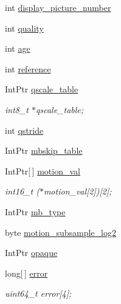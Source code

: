 \begin{DoxyCompactItemize}
\item 
int \hyperlink{struct_tao_1_1_f_fmpeg_1_1_f_fmpeg_1_1_a_v_frame_a6a74cbe724a8d8e713758e43b1b9d74c}{display\_\-picture\_\-number}
\item 
int \hyperlink{struct_tao_1_1_f_fmpeg_1_1_f_fmpeg_1_1_a_v_frame_adcb379855ce61aaa4e9628536374a1ee}{quality}
\item 
int \hyperlink{struct_tao_1_1_f_fmpeg_1_1_f_fmpeg_1_1_a_v_frame_ad5f4419aa6730caf1ee4ec80164c8874}{age}
\item 
int \hyperlink{struct_tao_1_1_f_fmpeg_1_1_f_fmpeg_1_1_a_v_frame_a1860efaee2f1c6f5efab3135d82668ab}{reference}
\item 
IntPtr \hyperlink{struct_tao_1_1_f_fmpeg_1_1_f_fmpeg_1_1_a_v_frame_ac23d7bd4f3cca8bbca90a40e8a5d7761}{qscale\_\-table}
\begin{DoxyCompactList}\small\item\em int8\_\-t $\ast$qscale\_\-table; \item\end{DoxyCompactList}\item 
int \hyperlink{struct_tao_1_1_f_fmpeg_1_1_f_fmpeg_1_1_a_v_frame_aead6278a888fe7a9237e6b61e3770ba8}{qstride}
\item 
IntPtr \hyperlink{struct_tao_1_1_f_fmpeg_1_1_f_fmpeg_1_1_a_v_frame_acff72d0cc65f263a4840f51cf28e6499}{mbskip\_\-table}
\item 
IntPtr\mbox{[}$\,$\mbox{]} \hyperlink{struct_tao_1_1_f_fmpeg_1_1_f_fmpeg_1_1_a_v_frame_a3030302698ee47779adfa2114fcb952c}{motion\_\-val}
\begin{DoxyCompactList}\small\item\em int16\_\-t ($\ast$motion\_\-val\mbox{[}2\mbox{]})\mbox{[}2\mbox{]}; \item\end{DoxyCompactList}\item 
IntPtr \hyperlink{struct_tao_1_1_f_fmpeg_1_1_f_fmpeg_1_1_a_v_frame_a3cbf839d220e4c2fbdbe0400ad34c182}{mb\_\-type}
\item 
byte \hyperlink{struct_tao_1_1_f_fmpeg_1_1_f_fmpeg_1_1_a_v_frame_aff7134ee6d609c50165689bf45834619}{motion\_\-subsample\_\-log2}
\item 
IntPtr \hyperlink{struct_tao_1_1_f_fmpeg_1_1_f_fmpeg_1_1_a_v_frame_afe3e6a5b5f9752bbd7000b705985f76d}{opaque}
\item 
long\mbox{[}$\,$\mbox{]} \hyperlink{struct_tao_1_1_f_fmpeg_1_1_f_fmpeg_1_1_a_v_frame_af9a97623ff7e2446c8cc815c61a27fa1}{error}
\begin{DoxyCompactList}\small\item\em uint64\_\-t error\mbox{[}4\mbox{]}; \item\end{DoxyCompactList}\item 

\end{DoxyCompactItemize}
